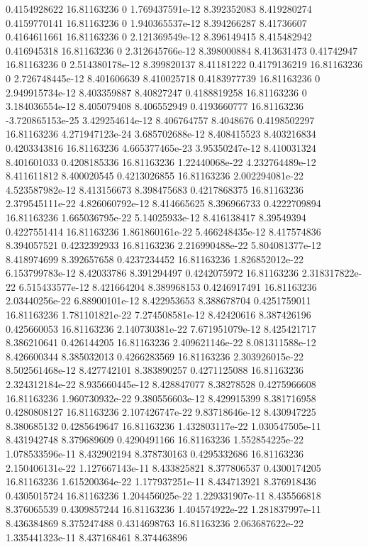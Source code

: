 {0.4154928622 16.81163236 0 1.769437591e-12 8.392352083 8.419280274
0.4159770141 16.81163236 0 1.940365537e-12 8.394266287 8.41736607
0.4164611661 16.81163236 0 2.121369549e-12 8.396149415 8.415482942
0.416945318 16.81163236 0 2.312645766e-12 8.398000884 8.413631473
0.41742947 16.81163236 0 2.514380178e-12 8.399820137 8.41181222
0.4179136219 16.81163236 0 2.726748445e-12 8.401606639 8.410025718
0.4183977739 16.81163236 0 2.949915734e-12 8.403359887 8.40827247
0.4188819258 16.81163236 0 3.184036554e-12 8.405079408 8.406552949
0.4193660777 16.81163236 -3.720865153e-25 3.429254614e-12 8.406764757 8.4048676
0.4198502297 16.81163236 4.271947123e-24 3.685702688e-12 8.408415523 8.403216834
0.4203343816 16.81163236 4.665377465e-23 3.95350247e-12 8.410031324 8.401601033
0.4208185336 16.81163236 1.22440068e-22 4.232764489e-12 8.411611812 8.400020545
0.4213026855 16.81163236 2.002294081e-22 4.523587982e-12 8.413156673 8.398475683
0.4217868375 16.81163236 2.379545111e-22 4.826060792e-12 8.414665625 8.396966733
0.4222709894 16.81163236 1.665036795e-22 5.14025933e-12 8.416138417 8.39549394
0.4227551414 16.81163236 1.861860161e-22 5.466248435e-12 8.417574836 8.394057521
0.4232392933 16.81163236 2.216990488e-22 5.804081377e-12 8.418974699 8.392657658
0.4237234452 16.81163236 1.826852012e-22 6.153799783e-12 8.42033786 8.391294497
0.4242075972 16.81163236 2.318317822e-22 6.515433577e-12 8.421664204 8.389968153
0.4246917491 16.81163236 2.03440256e-22 6.88900101e-12 8.422953653 8.388678704
0.4251759011 16.81163236 1.781101821e-22 7.274508581e-12 8.42420616 8.387426196
0.425660053 16.81163236 2.140730381e-22 7.671951079e-12 8.425421717 8.386210641
0.426144205 16.81163236 2.409621146e-22 8.081311588e-12 8.426600344 8.385032013
0.4266283569 16.81163236 2.303926015e-22 8.502561468e-12 8.427742101 8.383890257
0.4271125088 16.81163236 2.324312184e-22 8.935660445e-12 8.428847077 8.38278528
0.4275966608 16.81163236 1.960730932e-22 9.380556603e-12 8.429915399 8.381716958
0.4280808127 16.81163236 2.107426747e-22 9.83718646e-12 8.430947225 8.380685132
0.4285649647 16.81163236 1.432803117e-22 1.030547505e-11 8.431942748 8.379689609
0.4290491166 16.81163236 1.552854225e-22 1.078533596e-11 8.432902194 8.378730163
0.4295332686 16.81163236 2.150406131e-22 1.127667143e-11 8.433825821 8.377806537
0.4300174205 16.81163236 1.615200364e-22 1.177937251e-11 8.434713921 8.376918436
0.4305015724 16.81163236 1.204456025e-22 1.229331907e-11 8.435566818 8.376065539
0.4309857244 16.81163236 1.404574922e-22 1.281837997e-11 8.436384869 8.375247488
0.4314698763 16.81163236 2.063687622e-22 1.335441323e-11 8.437168461 8.374463896
}
